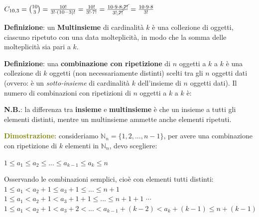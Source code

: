 \begin{enumerate}[nosep]
\begin{boxA}
        {\centering
            $C_{10,3} = \binom{10}{3} = \frac{10!}{3! \cdot (10 - 3)!} = \frac{10!}{3! \cdot 7!} = \frac{10 \cdot 9 \cdot 8 \cdot \cancel{7!}}{3! \cdot \cancel{7!}} = \frac{10 \cdot 9 \cdot 8}{3!}$
        \par}
    \end{boxA}
\end{enumerate}

\begin{flushleft}
    \textbf{Definizione}: un \textbf{Multinsieme} di cardinalità $k$ è una collezione di oggetti, ciascuno ripetuto con una data molteplicità, in modo che la somma delle molteplicità sia pari a $k$. 

    \textbf{Definizione}: una \textbf{combinazione con ripetizione} di $n$ oggetti a $k$ a $k$ è una collezione di $k$ oggetti (non necessariamente distinti) scelti tra gli $n$ oggetti dati (ovvero: è un \textit{sotto-insieme} di cardinalità $k$ dell'insieme di $n$ oggetti dati). Il numero di combinazioni con ripetizioni di $n$ oggetti a $k$ a $k$ è:

    {\centering
    \par}

    \textbf{N.B.}: la differenza tra \textbf{insieme} e \textbf{multinsieme} è che un insieme a tutti gli elementi distinti, mentre un multinsieme ammette anche elementi ripetuti.
    \begin{boxA}
        \textcolor{olive}{\textbf{Dimostrazione}}: consideriamo $\mathbb{N}_n = \{1, 2, ..., n - 1\}$, per avere una combinazione con ripetizione di $k$ elementi in $\mathbb{N}_n$, devo scegliere:

        {\centering
            $1 \leq a_1 \leq a_2 \leq ... \leq a_{k - 1} \leq a_k \leq n$
        \par}
        Osservando le combinazioni semplici, cioè con elementi tutti distinti: \newline
        $1 \leq a_1 < a_2 + 1 \leq a_3 + 1 \leq ... \leq n + 1$ \newline
        $1 \leq a_1 < a_2 + 1 < a_3 + 1 + 1 \leq ... \leq n + 1 + 1$ \newline
        $\cdots$ \newline
        $1 \leq a_1 < a_2 + 1 < a_3 + 2 < ... < a_{k - 1} + (k - 2) < a_k + (k - 1) \leq n + (k - 1)$


\end{boxA}
\end{flushleft}
